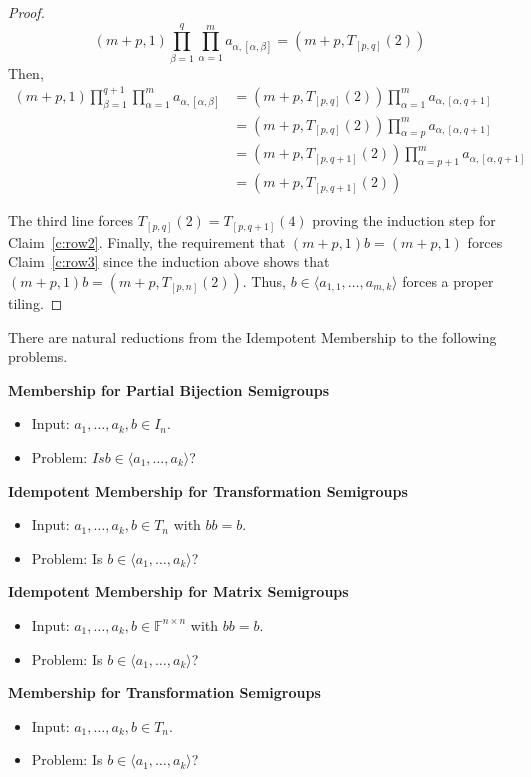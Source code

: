 \documentclass{amsart}
\theoremstyle{remark}
\numberwithin{equation}{section}
\begin{document}
\begin{proof}
$$(m+p,1) \prod_{\beta=1}^q \prod_{\alpha=1}^m a_{\alpha,[\alpha,\beta]} = (m+p, T_{[p,q]}(2))$$
Then,
\begin{align*}
(m+p,1)\prod_{\beta=1}^{q+1} \prod_{\alpha=1}^m a_{\alpha,[\alpha,\beta]} &= (m+p, T_{[p,q]}(2)) \prod_{\alpha=1}^m a_{\alpha,[\alpha,q+1]} \\
&= (m+p, T_{[p,q]}(2)) \prod_{\alpha=p}^m a_{\alpha,[\alpha,q+1]} \\
&= (m+p,T_{[p,q+1]}(2)) \prod_{\alpha=p+1}^m a_{\alpha,[\alpha,q+1]}\\
&= (m+p,T_{[p,q+1]}(2))
\end{align*}

The third line forces $T_{[p,q]}(2) = T_{[p,q+1]}(4)$ proving the induction step for Claim~\ref{c:row2}. Finally, the requirement that $(m+p,1)b=(m+p,1)$ forces Claim~\ref{c:row3} since the induction above shows that $(m+p,1)b=(m+p,T_{[p,n]}(2))$. Thus, $b \in \langle a_{1,1} , \dots, a_{m,k}\rangle$ forces a proper tiling.
\end{proof}

There are natural reductions from the Idempotent Membership to the following problems.

\medskip
{\bf Membership for Partial Bijection Semigroups}
\begin{itemize}
\item Input: $a_1,\dots,a_k,b \in I_n$.
\item Problem: $Is b \in \langle a_1,\dots,a_k\rangle$?
\end{itemize}

\medskip
{\bf Idempotent Membership for Transformation Semigroups}
\begin{itemize}
\item Input: $a_1,\dots,a_k,b \in T_n$ with $bb=b$.
\item Problem: Is $b \in \langle a_1,\dots,a_k\rangle$?
\end{itemize} 

\medskip
{\bf Idempotent Membership for Matrix Semigroups}
\begin{itemize}
\item Input: $a_1,\dots,a_k,b \in \mathbb{F}^{n \times n}$ with $bb=b$.
\item Problem: Is $b \in \langle a_1,\dots,a_k\rangle$?
\end{itemize} 

\medskip
{\bf Membership for Transformation Semigroups}
\begin{itemize}
\item Input: $a_1,\dots,a_k,b \in T_n$.
\item Problem: Is $b \in \langle a_1,\dots,a_k\rangle$?
\end{itemize} 
\end{document}
